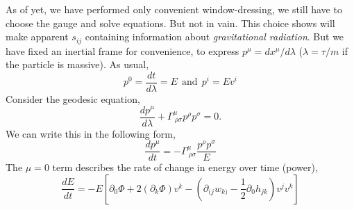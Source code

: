 As of yet, we have performed only convenient window-dressing, we still have to choose the gauge and solve equations. But not in vain. This choice shows will make apparent $s_{ij}$ containing information about \textit{gravitational radiation}. But we have fixed an inertial frame for convenience, to express $p^{\mu} = dx^{\mu}/d\lambda$ ($\lambda = \tau/m$ if the particle is massive). As usual, 
\begin{equation}
    p^0 = \frac{dt}{d\lambda} = E \ \ \text{and} \ \ p^i = Ev^i
\end{equation}
Consider the geodesic equation,
\begin{equation}
    \frac{dp^{\mu}}{d\lambda} + \Gamma^{\mu}_{\ \rho\sigma}p^{\rho}p^{\sigma}=0.
\end{equation}
We can write this in the following form, 
\begin{equation}
    \frac{dp^{\mu}}{dt} = -\Gamma^{\mu}_{\ \rho\sigma}\frac{p^{\rho}p^{\sigma}}{E}
\end{equation}
The $\mu=0$ term describes the rate of change in energy over time (power),
\begin{equation}
    \frac{dE}{dt} = -E\left[\partial_0\Phi + 2(\partial_k\Phi)v^k  - \left(\partial_{(j}w_{k)} - \frac{1}{2}\partial_{0}h_{jk}\right)v^jv^k\right]
\end{equation}

